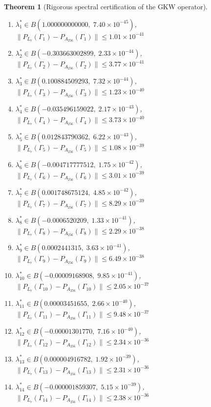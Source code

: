 \documentclass[11pt]{article}
\newtheorem{theorem}{Theorem}
\begin{document}
\begin{theorem}[Rigorous spectral certification of the GKW operator]
\begin{enumerate}
\item $\lambda_{1}^* \in B(1.000000000000,\; 7.40 \times 10^{-45})$, \quad $\|P_{L_r}(\Gamma_{1}) - P_{A_{256}}(\Gamma_{1})\| \leq 1.01 \times 10^{-41}$
\item $\lambda_{2}^* \in B(-0.303663002899,\; 2.33 \times 10^{-44})$, \quad $\|P_{L_r}(\Gamma_{2}) - P_{A_{256}}(\Gamma_{2})\| \leq 3.77 \times 10^{-41}$
\item $\lambda_{3}^* \in B(0.100884509293,\; 7.32 \times 10^{-44})$, \quad $\|P_{L_r}(\Gamma_{3}) - P_{A_{256}}(\Gamma_{3})\| \leq 1.23 \times 10^{-40}$
\item $\lambda_{4}^* \in B(-0.035496159022,\; 2.17 \times 10^{-43})$, \quad $\|P_{L_r}(\Gamma_{4}) - P_{A_{256}}(\Gamma_{4})\| \leq 3.73 \times 10^{-40}$
\item $\lambda_{5}^* \in B(0.012843790362,\; 6.22 \times 10^{-43})$, \quad $\|P_{L_r}(\Gamma_{5}) - P_{A_{256}}(\Gamma_{5})\| \leq 1.08 \times 10^{-39}$
\item $\lambda_{6}^* \in B(-0.004717777512,\; 1.75 \times 10^{-42})$, \quad $\|P_{L_r}(\Gamma_{6}) - P_{A_{256}}(\Gamma_{6})\| \leq 3.01 \times 10^{-39}$
\item $\lambda_{7}^* \in B(0.001748675124,\; 4.85 \times 10^{-42})$, \quad $\|P_{L_r}(\Gamma_{7}) - P_{A_{256}}(\Gamma_{7})\| \leq 8.29 \times 10^{-39}$
\item $\lambda_{8}^* \in B(-0.0006520209,\; 1.33 \times 10^{-41})$, \quad $\|P_{L_r}(\Gamma_{8}) - P_{A_{256}}(\Gamma_{8})\| \leq 2.29 \times 10^{-38}$
\item $\lambda_{9}^* \in B(0.0002441315,\; 3.63 \times 10^{-41})$, \quad $\|P_{L_r}(\Gamma_{9}) - P_{A_{256}}(\Gamma_{9})\| \leq 6.49 \times 10^{-38}$
\item $\lambda_{10}^* \in B(-0.00009168908,\; 9.85 \times 10^{-41})$, \quad $\|P_{L_r}(\Gamma_{10}) - P_{A_{256}}(\Gamma_{10})\| \leq 2.05 \times 10^{-37}$
\item $\lambda_{11}^* \in B(0.00003451655,\; 2.66 \times 10^{-40})$, \quad $\|P_{L_r}(\Gamma_{11}) - P_{A_{256}}(\Gamma_{11})\| \leq 9.48 \times 10^{-37}$
\item $\lambda_{12}^* \in B(-0.00001301770,\; 7.16 \times 10^{-40})$, \quad $\|P_{L_r}(\Gamma_{12}) - P_{A_{256}}(\Gamma_{12})\| \leq 2.34 \times 10^{-36}$
\item $\lambda_{13}^* \in B(0.000004916782,\; 1.92 \times 10^{-39})$, \quad $\|P_{L_r}(\Gamma_{13}) - P_{A_{256}}(\Gamma_{13})\| \leq 2.31 \times 10^{-36}$
\item $\lambda_{14}^* \in B(-0.000001859307,\; 5.15 \times 10^{-39})$, \quad $\|P_{L_r}(\Gamma_{14}) - P_{A_{256}}(\Gamma_{14})\| \leq 2.38 \times 10^{-36}$

\end{enumerate}
\end{theorem}
\end{document}
